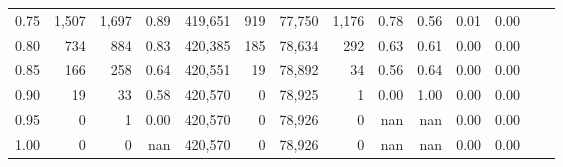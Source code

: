 \begin{tabular}{rrrrrrrrrrrrrr}
0.75 &   1,507 &   1,697 &    0.89 &  419,651 &      919 &  77,750 &   1,176 &  0.78 &  0.56 &  0.01 &      0.00 \\
0.80 &     734 &     884 &    0.83 &  420,385 &      185 &  78,634 &     292 &  0.63 &  0.61 &  0.00 &      0.00 \\
0.85 &     166 &     258 &    0.64 &  420,551 &       19 &  78,892 &      34 &  0.56 &  0.64 &  0.00 &      0.00 \\
0.90 &      19 &      33 &    0.58 &  420,570 &        0 &  78,925 &       1 &  0.00 &  1.00 &  0.00 &      0.00 \\
0.95 &       0 &       1 &    0.00 &  420,570 &        0 &  78,926 &       0 &   nan &   nan &  0.00 &      0.00 \\
1.00 &       0 &       0 &     nan &  420,570 &        0 &  78,926 &       0 &   nan &   nan &  0.00 &      0.00 \\
\bottomrule
\end{tabular}
